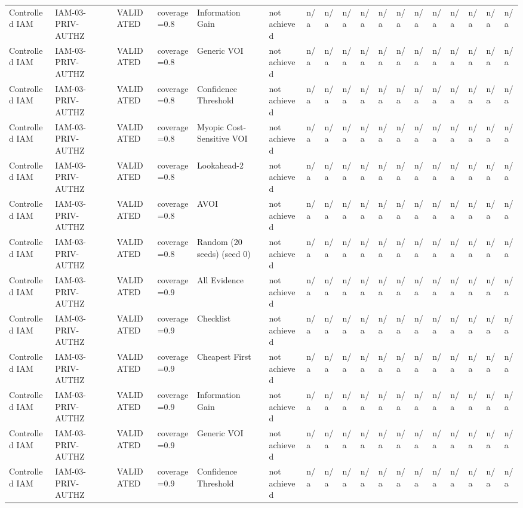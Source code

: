 \begin{table}[!ht]
{\begin{tabular}{llllllllllllllllll}
Controlled IAM & IAM-03-PRIV-AUTHZ & VALIDATED & coverage=0.8 & Information Gain & not achieved & n/a & n/a & n/a & n/a & n/a & n/a & n/a & n/a & n/a & n/a & n/a & n/a \\
Controlled IAM & IAM-03-PRIV-AUTHZ & VALIDATED & coverage=0.8 & Generic VOI & not achieved & n/a & n/a & n/a & n/a & n/a & n/a & n/a & n/a & n/a & n/a & n/a & n/a \\
Controlled IAM & IAM-03-PRIV-AUTHZ & VALIDATED & coverage=0.8 & Confidence Threshold & not achieved & n/a & n/a & n/a & n/a & n/a & n/a & n/a & n/a & n/a & n/a & n/a & n/a \\
Controlled IAM & IAM-03-PRIV-AUTHZ & VALIDATED & coverage=0.8 & Myopic Cost-Sensitive VOI & not achieved & n/a & n/a & n/a & n/a & n/a & n/a & n/a & n/a & n/a & n/a & n/a & n/a \\
Controlled IAM & IAM-03-PRIV-AUTHZ & VALIDATED & coverage=0.8 & Lookahead-2 & not achieved & n/a & n/a & n/a & n/a & n/a & n/a & n/a & n/a & n/a & n/a & n/a & n/a \\
Controlled IAM & IAM-03-PRIV-AUTHZ & VALIDATED & coverage=0.8 & AVOI & not achieved & n/a & n/a & n/a & n/a & n/a & n/a & n/a & n/a & n/a & n/a & n/a & n/a \\
Controlled IAM & IAM-03-PRIV-AUTHZ & VALIDATED & coverage=0.8 & Random (20 seeds) (seed 0) & not achieved & n/a & n/a & n/a & n/a & n/a & n/a & n/a & n/a & n/a & n/a & n/a & n/a \\
Controlled IAM & IAM-03-PRIV-AUTHZ & VALIDATED & coverage=0.9 & All Evidence & not achieved & n/a & n/a & n/a & n/a & n/a & n/a & n/a & n/a & n/a & n/a & n/a & n/a \\
Controlled IAM & IAM-03-PRIV-AUTHZ & VALIDATED & coverage=0.9 & Checklist & not achieved & n/a & n/a & n/a & n/a & n/a & n/a & n/a & n/a & n/a & n/a & n/a & n/a \\
Controlled IAM & IAM-03-PRIV-AUTHZ & VALIDATED & coverage=0.9 & Cheapest First & not achieved & n/a & n/a & n/a & n/a & n/a & n/a & n/a & n/a & n/a & n/a & n/a & n/a \\
Controlled IAM & IAM-03-PRIV-AUTHZ & VALIDATED & coverage=0.9 & Information Gain & not achieved & n/a & n/a & n/a & n/a & n/a & n/a & n/a & n/a & n/a & n/a & n/a & n/a \\
Controlled IAM & IAM-03-PRIV-AUTHZ & VALIDATED & coverage=0.9 & Generic VOI & not achieved & n/a & n/a & n/a & n/a & n/a & n/a & n/a & n/a & n/a & n/a & n/a & n/a \\
Controlled IAM & IAM-03-PRIV-AUTHZ & VALIDATED & coverage=0.9 & Confidence Threshold & not achieved & n/a & n/a & n/a & n/a & n/a & n/a & n/a & n/a & n/a & n/a & n/a & n/a \\

\end{tabular}}
\end{table}
